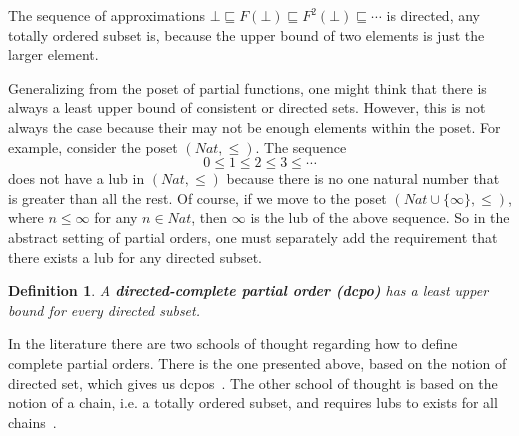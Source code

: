 \documentclass{tufte-handout}
\newtheorem{definition}{Definition}%
\begin{document}
The sequence of approximations $\bot \sqsubseteq F(\bot) \sqsubseteq
F^2(\bot) \sqsubseteq \cdots$ is directed, any totally ordered subset
is, because the upper bound of two elements is just the larger
element.

Generalizing from the poset of partial functions, one might think that
there is always a least upper bound of consistent or directed sets.
However, this is not always the case because their may not be enough
elements within the poset. For example, consider the poset
$(\mathit{Nat},\leq)$. The sequence
\[
  0 \leq 1 \leq 2 \leq 3 \leq \cdots
\]
does not have a lub in $(\mathit{Nat},\leq)$ because there is no one
natural number that is greater than all the rest. Of course, if we
move to the poset $(\mathit{Nat} \cup \{\infty\},\leq)$, where $n \leq
\infty$ for any $n \in \mathit{Nat}$, then $\infty$ is the lub of the
above sequence. So in the abstract setting of partial orders, one must
separately add the requirement that there exists a lub for any
directed subset.

\begin{definition}
  A \textbf{\emph{directed-complete partial order (dcpo)}} has a least
  upper bound for every directed subset.
\end{definition}


In the literature there are two schools of thought regarding how to
define complete partial orders. There is the one presented above,
based on the notion of directed set, which gives us
dcpos~\citep{Gunter:1990aa,Mitchell:1996nn,Amadio:1998fk,Berger:2007aa}. The
other school of thought is based on the notion of a chain, i.e. a
totally ordered subset, and requires lubs to exists for all
chains~\citep{Plotkin:1983aa,Schmidt:1986vn,Winskel:1993uq}.  


\end{document}
